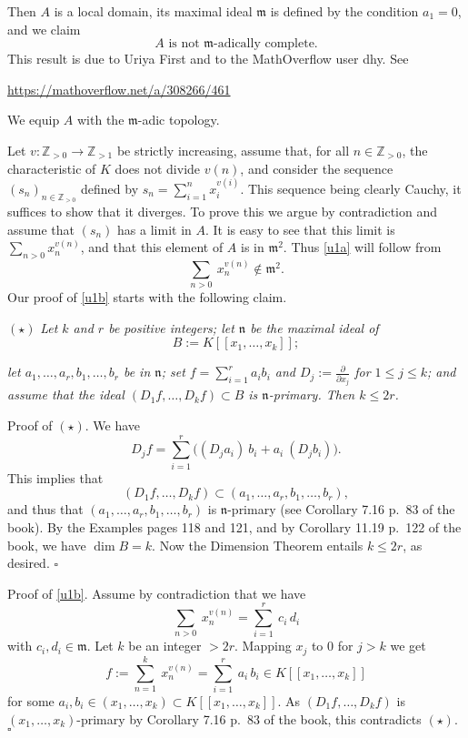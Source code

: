 \documentclass[parskip=half,fontsize=12pt]{scrartcl}%
\newcommand{\mf}{\mathfrak}
\begin{document}
Then $A$ is a local domain, its maximal ideal $\mathfrak m$ is defined by the condition $a_1=0$, and we claim 
\begin{equation}\label{u1a}
\boxed{A\text{ is not }\mathfrak m\text{-adically complete.}}
\end{equation}
This result is due to Uriya First and to the MathOverflow user dhy. See \\ %

\centerline{\href{https://mathoverflow.net/a/308266/461}{https://mathoverflow.net/a/308266/461}}

We equip $A$ with the $\mf m$-adic topology.

Let $v:\mathbb Z_{>0}\to\mathbb Z_{>1}$ be strictly increasing, assume that, for all $n\in\mathbb Z_{>0}$, the characteristic of $K$ does not divide $v(n)$, and consider the sequence $(s_n)_{n\in\mathbb Z_{>0}}$ defined by $s_n=\sum_{i=1}^nx_i^{v(i)}$. This sequence being clearly Cauchy, it suffices to show that it diverges. To prove this we argue by contradiction and assume that $(s_n)$ has a limit in $A$. It is easy to see that this limit is $\sum_{n>0}x_n^{v(n)}$, and that this element of $A$ is in $\mf m^2$. Thus \eqref{u1a} will follow from 
\begin{equation}\label{u1b}
\sum_{n>0}\ x_n^{v(n)}\notin\mf m^2.
\end{equation} 
Our proof of \eqref{u1b} starts with the following claim.

$(\star)$ {\em Let $k$ and $r$ be positive integers; let $\mathfrak n$ be the maximal ideal of} 
$$
B:=K[[x_1,\dots,x_k]];
$$ 

{\em let $a_1,\dots,a_r,b_1,\dots,b_r$ be in $\mathfrak n$; set $f=\sum_{i=1}^ra_ib_i$ and $D_j:=\frac{\partial}{\partial x_j}$ for $1\le j\le k$; and assume that the ideal $(D_1f,\dots,D_kf)\subset B$ is $\mathfrak n$-primary. Then $k\le2r$.}

Proof of $(\star)$. We have 
$$
D_jf=\sum_{i=1}^r\Big((D_ja_i)\ b_i+a_i\ (D_jb_i)\Big). 
$$ 
This implies that 
$$
(D_1f,\dots,D_kf)\subset(a_1,\dots,a_r,b_1,\dots,b_r),
$$ 
and thus that $(a_1,\dots,a_r,b_1,\dots,b_r)$ is $\mathfrak n$-primary (see Corollary 7.16 p.~83 of the book). By the Examples pages 118 and 121, and by Corollary 11.19 p.~122 of the book, we have $\dim B=k$. Now the Dimension Theorem entails $k\le2r$, as desired. $\square$

Proof of \eqref{u1b}. Assume by contradiction that we have 
$$
\sum_{n>0}\ x_n^{v(n)}=\sum_{i=1}^r\ c_i\,d_i
$$ 
with $c_i,d_i\in\mf m$. Let $k$ be an integer $>2r$. Mapping $x_j$ to $0$ for $j>k$ we get 
$$
f:=\sum_{n=1}^k\ x_n^{v(n)}=\sum_{i=1}^r\ a_i\,b_i\in K[[x_1,\dots,x_k]]
$$ 
for some $a_i,b_i\in(x_1,\dots,x_k)\subset K[[x_1,\dots,x_k]]$. As $(D_1f,\dots,D_kf)$ is $(x_1,\dots,x_k)$-primary by Corollary 7.16 p.~83 of the book, this contradicts $(\star)$. $\square$
\end{document}
